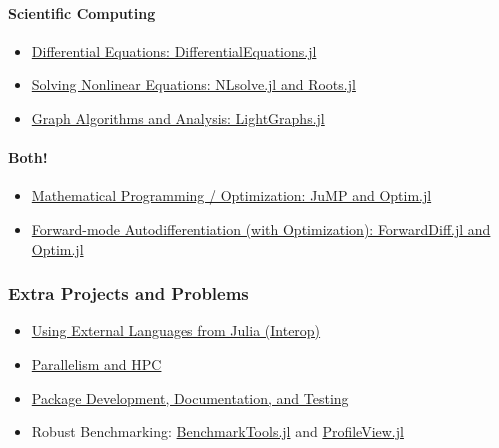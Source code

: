 \documentclass[11pt]{article}
\begin{document}
\paragraph{Scientific Computing}\label{scientific-computing}

\begin{itemize}
\itemsep1pt\parskip0pt
\item
  \href{http://ucidatascienceinitiative.github.io/IntroToJulia/Html/DiffEq}{Differential
  Equations: DifferentialEquations.jl}
\item
  \href{http://ucidatascienceinitiative.github.io/IntroToJulia/Html/NonlinearSolve}{Solving
  Nonlinear Equations: NLsolve.jl and Roots.jl}
\item
  \href{http://ucidatascienceinitiative.github.io/IntroToJulia/Html/Graphs}{Graph
  Algorithms and Analysis: LightGraphs.jl}
\end{itemize}

\paragraph{Both!}\label{both}

\begin{itemize}
\itemsep1pt\parskip0pt
\item
  \href{http://ucidatascienceinitiative.github.io/IntroToJulia/Html/Optimization}{Mathematical
  Programming / Optimization: JuMP and Optim.jl}
\item
  \href{http://ucidatascienceinitiative.github.io/IntroToJulia/Html/ForwardDiff}{Forward-mode
  Autodifferentiation (with Optimization): ForwardDiff.jl and Optim.jl}
\end{itemize}

\subsubsection{Extra Projects and
Problems}\label{extra-projects-and-problems}

\begin{itemize}
\itemsep1pt\parskip0pt
\item
  \href{http://ucidatascienceinitiative.github.io/IntroToJulia/Html/Interop}{Using
  External Languages from Julia (Interop)}
\item
  \href{http://ucidatascienceinitiative.github.io/IntroToJulia/Html/HPCJulia}{Parallelism
  and HPC}
\item
  \href{http://ucidatascienceinitiative.github.io/IntroToJulia/Html/PackageDevelopment}{Package
  Development, Documentation, and Testing}
\item
  Robust Benchmarking:
  \href{https://github.com/JuliaCI/BenchmarkTools.jl}{BenchmarkTools.jl}
  and \href{https://github.com/timholy/ProfileView.jl}{ProfileView.jl}
\end{itemize}
\end{document}
